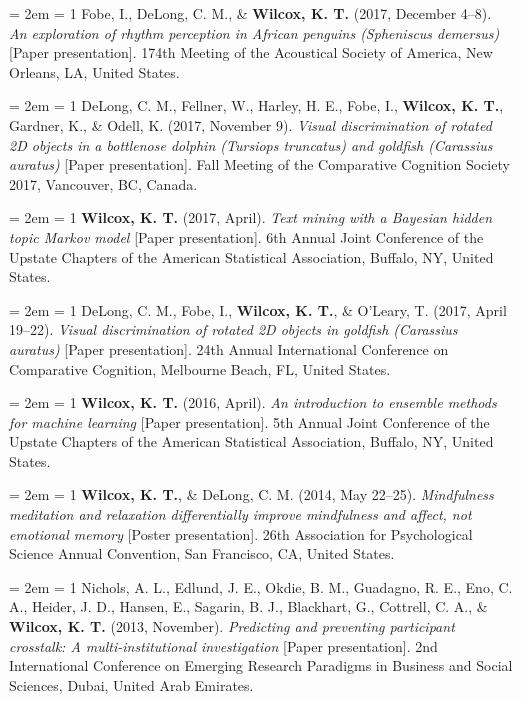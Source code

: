 \documentclass[
  12 pt,
]{article}
\begin{document}
\hangindent = 2em \hangafter = 1 Fobe, I., DeLong, C. M., \&
\textbf{Wilcox, K. T.} (2017, December 4--8). \emph{An exploration of
rhythm perception in African penguins (Spheniscus demersus)} {[}Paper
presentation{]}. 174th Meeting of the Acoustical Society of America, New
Orleans, LA, United States.

\hangindent = 2em \hangafter = 1 DeLong, C. M., Fellner, W., Harley, H.
E., Fobe, I., \textbf{Wilcox, K. T.}, Gardner, K., \& Odell, K. (2017,
November 9). \emph{Visual discrimination of rotated 2D objects in a
bottlenose dolphin (Tursiops truncatus) and goldfish (Carassius
auratus)} {[}Paper presentation{]}. Fall Meeting of the Comparative
Cognition Society 2017, Vancouver, BC, Canada.

\hangindent = 2em \hangafter = 1 \textbf{Wilcox, K. T.} (2017, April).
\emph{Text mining with a Bayesian hidden topic Markov model} {[}Paper
presentation{]}. 6th Annual Joint Conference of the Upstate Chapters of
the American Statistical Association, Buffalo, NY, United States.

\hangindent = 2em \hangafter = 1 DeLong, C. M., Fobe, I.,
\textbf{Wilcox, K. T.}, \& O'Leary, T. (2017, April 19--22).
\emph{Visual discrimination of rotated 2D objects in goldfish (Carassius
auratus)} {[}Paper presentation{]}. 24th Annual International Conference
on Comparative Cognition, Melbourne Beach, FL, United States.

\hangindent = 2em \hangafter = 1 \textbf{Wilcox, K. T.} (2016, April).
\emph{An introduction to ensemble methods for machine learning} {[}Paper
presentation{]}. 5th Annual Joint Conference of the Upstate Chapters of
the American Statistical Association, Buffalo, NY, United States.

\hangindent = 2em \hangafter = 1 \textbf{Wilcox, K. T.}, \& DeLong, C.
M. (2014, May 22--25). \emph{Mindfulness meditation and relaxation
differentially improve mindfulness and affect, not emotional memory}
{[}Poster presentation{]}. 26th Association for Psychological Science
Annual Convention, San Francisco, CA, United States.

\hangindent = 2em \hangafter = 1 Nichols, A. L., Edlund, J. E., Okdie,
B. M., Guadagno, R. E., Eno, C. A., Heider, J. D., Hansen, E., Sagarin,
B. J., Blackhart, G., Cottrell, C. A., \& \textbf{Wilcox, K. T.} (2013,
November). \emph{Predicting and preventing participant crosstalk: A
multi-institutional investigation} {[}Paper presentation{]}. 2nd
International Conference on Emerging Research Paradigms in Business and
Social Sciences, Dubai, United Arab Emirates.
\end{document}

